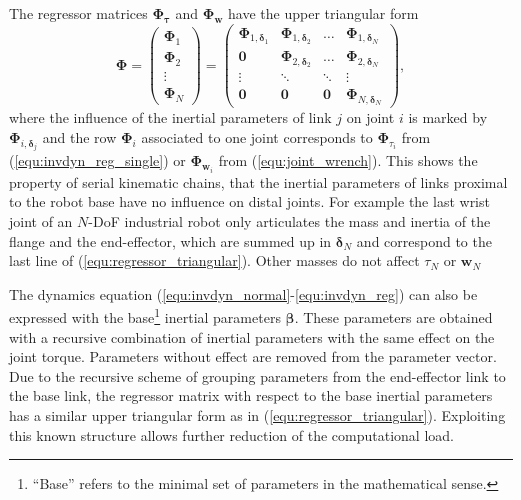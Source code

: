\documentclass{svproc}
\newcommand{\bm}[1]{\boldsymbol{#1}}
\begin{document}
The regressor matrices $\bm{\Phi}_{\bm{\tau}}$ and 
$\bm{\Phi}_{\bm{w}}$
have the upper triangular form
\begin{equation}
\bm{\Phi}=
\begin{pmatrix} \bm{\Phi}_{1} \\ \bm{\Phi}_{2} \\ \vdots \\ \bm{\Phi}_{N}
\end{pmatrix}
=
\begin{pmatrix} \bm{\Phi}_{1,\bm{\delta}_1} & \bm{\Phi}_{1,\bm{\delta}_2} & \dots & \bm{\Phi}_{1,\bm{\delta}_N} \\
\bm{0} & \bm{\Phi}_{2,\bm{\delta}_2} & \dots & \bm{\Phi}_{2,\bm{\delta}_N} \\
\vdots & \ddots & \ddots & \vdots \\
\bm{0} & \bm{0} & \bm{0} & \bm{\Phi}_{N,\bm{\delta}_N}
\end{pmatrix},
\label{equ:regressor_triangular}
\end{equation}
where the influence of the inertial parameters of link $j$ on joint $i$ is marked by $\bm{\Phi}_{i,\bm{\delta}_j}$ and the row $\bm{\Phi}_{i}$  associated to one joint corresponds to $\bm{\Phi}_{\tau_i}$ from (\ref{equ:invdyn_reg_single}) or $\bm{\Phi}_{\bm{w}_i}$ from (\ref{equ:joint_wrench}).
%
This shows the property of serial kinematic chains, that the inertial parameters of links proximal to the robot base have no influence on distal joints.
For example the last wrist joint of an $N$-DoF industrial robot only articulates the mass and inertia of the flange and the end-effector, which are summed up in $\bm{\delta}_N$ and correspond to the last line of (\ref{equ:regressor_triangular}).
Other masses do not affect $\tau_N$ or $\bm{w}_N$

The dynamics equation (\ref{equ:invdyn_normal}-\ref{equ:invdyn_reg}) can also be expressed with the base\footnote{``Base'' refers to the minimal set of parameters in the mathematical sense.} inertial parameters $\bm{\beta}$.
These parameters are obtained with a recursive combination of inertial parameters with the same effect on the joint torque.
Parameters without effect are removed from the parameter vector.
Due to the recursive scheme of grouping parameters from the end-effector link to the base link, the regressor matrix with respect to the base inertial parameters has a similar upper triangular form as in (\ref{equ:regressor_triangular}).
Exploiting this known structure allows further reduction of the computational load.
\end{document}
